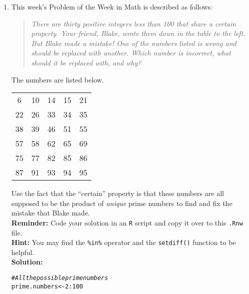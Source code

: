 \documentclass{article}\usepackage[]{graphicx}\usepackage[]{xcolor}
\makeatletter
\newcommand{\hlnum}[1]{\textcolor[rgb]{0.686,0.059,0.569}{#1}}%
\newcommand{\hlcom}[1]{\textcolor[rgb]{0.678,0.584,0.686}{\textit{#1}}}%
\newcommand{\hlopt}[1]{\textcolor[rgb]{0,0,0}{#1}}%
\newcommand{\hldef}[1]{\textcolor[rgb]{0.345,0.345,0.345}{#1}}%
\newcommand{\hlkwb}[1]{\textcolor[rgb]{0.69,0.353,0.396}{#1}}%
\newenvironment{kframe}{%
 \def\at@end@of@kframe{}%
 \ifinner\ifhmode%
  \def\at@end@of@kframe{\end{minipage}}%
  \begin{minipage}{\columnwidth}%
 \fi\fi%
 \def\FrameCommand##1{\hskip\@totalleftmargin \hskip-\fboxsep
 \colorbox{shadecolor}{##1}\hskip-\fboxsep
     \hskip-\linewidth \hskip-\@totalleftmargin \hskip\columnwidth}%
 \MakeFramed {\advance\hsize-\width
   \@totalleftmargin\z@ \linewidth\hsize
   \@setminipage}}%
 {\par\unskip\endMakeFramed%
 \at@end@of@kframe}
\newenvironment{knitrout}{}{} %
\makeatother
\begin{document}
\begin{enumerate}
\item This week's Problem of the Week in Math is described as follows:
\begin{quotation}
  \textit{There are thirty positive integers less than 100 that share a certain 
  property. Your friend, Blake, wrote them down in the table to the left. But 
  Blake made a mistake! One of the numbers listed is wrong and should be replaced 
  with another. Which number is incorrect, what should it be replaced with, and 
  why?}
\end{quotation}
The numbers are listed below.
\begin{center}
  \begin{tabular}{ccccc}
    6 & 10 & 14 & 15 & 21\\
    22 & 26 & 33 & 34 & 35\\
    38 & 39 & 46 & 51 & 55\\
    57 & 58 & 62 & 65 & 69\\
    75 & 77 & 82 & 85 & 86\\
    87 & 91 & 93 & 94 & 95
  \end{tabular}
\end{center}
Use the fact that the ``certain'' property is that these numbers are all supposed
to be the product of \emph{unique} prime numbers to find and fix the mistake that
Blake made.\\
\textbf{Reminder:} Code your solution in an \texttt{R} script and copy it over
to this \texttt{.Rnw} file.\\
\textbf{Hint:} You may find the \verb|%in%| operator and the \verb|setdiff()| function to be helpful.\\

\textbf{Solution:} 

\begin{knitrout}\scriptsize
{}\color{fgcolor}\begin{kframe}
\begin{alltt}
\hlcom{# All the possible prime numbers}
\hldef{prime.numbers} \hlkwb{<-} \hlnum{2}\hlopt{:}\hlnum{100}


\end{alltt}
\end{kframe}
\end{knitrout}
\end{enumerate}
\end{document}
